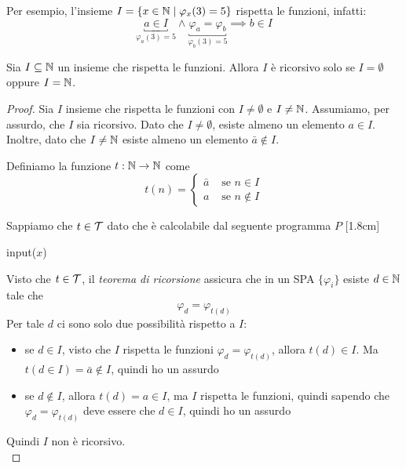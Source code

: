 Per esempio, l'insieme $I = \left\{x \in \mathbb{N} \mid \varphi_x (3) = 5 \right\}$ rispetta le funzioni, infatti:
$$
\underbracket{a \in I}_{\varphi_a (3) = 5} \wedge \underbracket{\varphi_a = \varphi_b}_{\varphi_b(3) = 5} \implies b \in I
$$

\begin{theor}
	Sia $I \subseteq \mathbb{N}$ un insieme che rispetta le funzioni. Allora $I$ è ricorsivo solo se $I = \emptyset$ oppure $I = \mathbb{N}$.
\end{theor}

\begin{proof}
	Sia $I$ insieme che rispetta le funzioni con $I \neq \emptyset$ e $I \neq \mathbb{N}$. Assumiamo, per assurdo, che $I$ sia ricorsivo. Dato che $I \neq \emptyset$, esiste almeno un elemento $a \in I$. Inoltre, dato che $I \neq \mathbb{N}$ esiste almeno un elemento $\bar{a} \notin I$.

	Definiamo la funzione $t: \mathbb{N} \rightarrow \mathbb{N}$ come
	$$
	t(n) = \begin{cases}
		\bar{a} & \text{ se } n \in I \\
		a & \text{ se } n \notin I
	\end{cases}
	$$

	Sappiamo che $t \in \mathcal{T}$ dato che è calcolabile dal seguente programma $P$
	[1.8cm]
	\begin{center}
		\begin{minipage}{.45\textwidth}
			\begin{tcolorbox}[
				colback=white,
				sharp corners,
				boxrule=.3mm,
				left=20pt,
				top=0pt,
				bottom=0pt,
				colbacktitle=white,
				coltitle=black
				]
				\begin{algorithm}[H]
					input($x$)\\
				\end{algorithm}
			\end{tcolorbox}
		\end{minipage}
	\end{center}
	Visto che $t \in \mathcal{T}$, il \textit{teorema di ricorsione} assicura che in un SPA $\{\varphi_i\}$ esiste $d \in \mathbb{N}$ tale che
	$$ \varphi_d = \varphi_{t(d)} $$
	Per tale $d$ ci sono solo due possibilità rispetto a $I$:
	\begin{itemize}
		\item se $d \in I$, visto che $I$ rispetta le funzioni $\varphi_d = \varphi_{t(d)}$, allora $t(d) \in I$. Ma $t(d \in I) = \bar{a} \notin I$, quindi ho un assurdo
		\item se $d \notin I$, allora $t(d) = a \in I$, ma $I$ rispetta le funzioni, quindi sapendo che $\varphi_d = \varphi_{t(d)}$ deve essere che $d \in I$, quindi ho un assurdo
	\end{itemize}
	Quindi $I$ non è ricorsivo.\\
  \end{proof}

